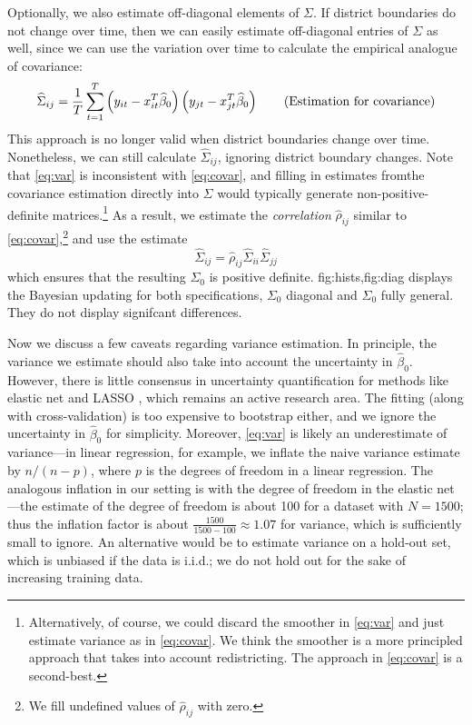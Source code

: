 \documentclass[12pt, letterpaper]{article}
\begin{document}
Optionally, we also estimate off-diagonal elements of $\Sigma$. If district boundaries do not change over time, then we can easily estimate off-diagonal entries of $\Sigma$ as well, since we can use the variation over time to calculate the empirical analogue of covariance: \[
\widehat \Sigma_{ij} = \frac{1}{T}\sum_{t=1}^T \left({y_{it} -x_{it}^T \widehat \beta_0}\right)\left({y_{jt} -x_{jt}^T \widehat \beta_0}\right) \tag{Estimation for covariance}
\label{eq:covar}
\]
This approach is no longer valid when district boundaries change over time. Nonetheless, we can still calculate $\hat \Sigma_{ij}$, ignoring district boundary changes.  Note that \eqref{eq:var} is inconsistent with \eqref{eq:covar}, and filling in estimates fromthe covariance estimation directly into $\Sigma$ would typically generate non-positive-definite matrices.\footnote{Alternatively, of course, we could discard the smoother in \eqref{eq:var} and just estimate variance as in \eqref{eq:covar}. We think the smoother is a more principled approach that takes into account redistricting. The approach in \eqref{eq:covar} is a second-best.} As a result, we estimate the \emph{correlation} $\hat \rho_{ij}$ similar to \eqref{eq:covar},\footnote{We fill undefined values of $\hat \rho_{ij}$ with zero.} and use the estimate 
 \[
\hat \Sigma_{ij} = \hat \rho_{ij} \hat \Sigma_{ii} \hat \Sigma_{jj}
 \tag{Estimation for covariance with correlation}
\label{eq:covar_corr}
\]
which ensures that the resulting $\Sigma_0$ is positive definite. \Cref
{fig:hists,fig:diag} displays the Bayesian updating for both specifications,
$\Sigma_0$ diagonal and $\Sigma_0$ fully general. They do not display signifcant
differences.

Now we discuss a few caveats regarding variance estimation. In principle, the variance we estimate should also take into account the uncertainty in $\hat \beta_0$. However, there is little consensus in uncertainty quantification for methods like elastic net and LASSO \citep{kyung2010penalized}, which remains an active research area. The fitting (along with cross-validation) is too expensive to bootstrap either, and we ignore the uncertainty in $\hat \beta_0$ for simplicity. Moreover, \eqref{eq:var} is likely an underestimate of variance---in linear regression, for example, we inflate the naive variance estimate by $n/(n-p)$, where $p$ is the degrees of freedom in a linear regression. The analogous inflation in our setting is with the degree of freedom in the elastic net \citep{zou2007degrees}---the estimate of the degree of freedom is about 100 for a dataset with $N=1500$; thus the inflation factor is about $\frac{1500}{1500-100} \approx 1.07$ for variance, which is sufficiently small to ignore. An alternative would be to estimate variance on a hold-out set, which is unbiased if the data is i.i.d.; we do not hold out for the sake of increasing training data.  
\end{document}
